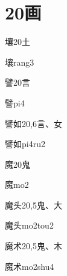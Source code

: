 
\section*{20画}

\begin{Entry}{壤}{20}{⼟}
  \begin{Phonetics}{壤}{rang3}
  \end{Phonetics}
\end{Entry}

\begin{Entry}{譬}{20}{⾔}
  \begin{Phonetics}{譬}{pi4}
  \end{Phonetics}
\end{Entry}

\begin{Entry}{譬如}{20,6}{⾔、⼥}
  \begin{Phonetics}{譬如}{pi4ru2}
  \end{Phonetics}
\end{Entry}

\begin{Entry}{魔}{20}{⿁}
  \begin{Phonetics}{魔}{mo2}
  \end{Phonetics}
\end{Entry}

\begin{Entry}{魔头}{20,5}{⿁、⼤}
  \begin{Phonetics}{魔头}{mo2tou2}
  \end{Phonetics}
\end{Entry}

\begin{Entry}{魔术}{20,5}{⿁、⽊}
  \begin{Phonetics}{魔术}{mo2shu4}
  \end{Phonetics}
\end{Entry}


